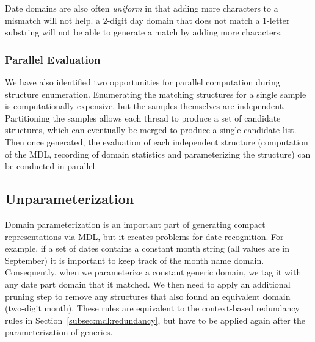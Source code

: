 Date domains are also often \textit{uniform} in that adding more characters to a mismatch will not help. \eg a $2$-digit day domain that does not match a $1$-letter substring will not be able to generate a match by adding more characters.

\subsubsection{Parallel Evaluation}
We have also identified two opportunities for parallel computation during structure enumeration.
Enumerating the matching structures for a single sample is computationally expensive, but the samples themselves are independent. 
Partitioning the samples allows each thread to produce a set of candidate structures, which can eventually be merged to produce a single candidate list.
Then once generated, the evaluation of each independent structure (computation of the MDL, recording of domain statistics and parameterizing the structure) can be conducted in parallel.

\subsection{Unparameterization}
Domain parameterization is an important part of generating compact representations via MDL, but it creates problems for date recognition. For example, if a set of dates contains a constant month string (\eg all values are in September) it is important to keep track of the month name domain. 
Consequently, when we parameterize a constant generic  domain, we tag it with any date part domain that it matched. 
We then need to apply an additional pruning step to remove any structures that also found an equivalent domain (\eg two-digit month). 
These rules are equivalent to the context-based redundancy rules in Section~\ref{subsec:mdl:redundancy}, but have to be applied again after the parameterization of generics.

